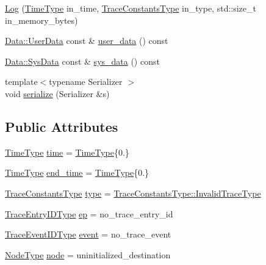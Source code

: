 \begin{DoxyCompactItemize}
\item 
\hyperlink{structvt_1_1trace_1_1_log_aeb68eef0ad06908635851378e2590b66}{Log} (\hyperlink{namespacevt_a2b9f28078dc309ad0706b69ded743e69}{Time\+Type} in\+\_\+time, \hyperlink{namespacevt_1_1trace_acf454dfbd581b0ebae895f90b5927a1d}{Trace\+Constants\+Type} in\+\_\+type, std\+::size\+\_\+t in\+\_\+memory\+\_\+bytes)
\item 
\hyperlink{structvt_1_1trace_1_1_log_1_1_data_1_1_user_data}{Data\+::\+User\+Data} const  \& \hyperlink{structvt_1_1trace_1_1_log_a7b251bc7dcebcbbafa29cc2ca6ea4c12}{user\+\_\+data} () const
\item 
\hyperlink{structvt_1_1trace_1_1_log_1_1_data_1_1_sys_data}{Data\+::\+Sys\+Data} const  \& \hyperlink{structvt_1_1trace_1_1_log_a082937c397ac5b47ffc9089ff94698f0}{sys\+\_\+data} () const
\item 
{\footnotesize template$<$typename Serializer $>$ }\\void \hyperlink{structvt_1_1trace_1_1_log_ac2fb17b80708e2adf690e3b68d225c25}{serialize} (Serializer \&s)
\end{DoxyCompactItemize}
\subsection*{Public Attributes}
\begin{DoxyCompactItemize}
\item 
\hyperlink{namespacevt_a2b9f28078dc309ad0706b69ded743e69}{Time\+Type} \hyperlink{structvt_1_1trace_1_1_log_ad707df71373f1f27df811868ea39bd3a}{time} = \hyperlink{namespacevt_a2b9f28078dc309ad0706b69ded743e69}{Time\+Type}\{0.\}
\item 
\hyperlink{namespacevt_a2b9f28078dc309ad0706b69ded743e69}{Time\+Type} \hyperlink{structvt_1_1trace_1_1_log_a577104fb3bef671a4c0129beaecaec2d}{end\+\_\+time} = \hyperlink{namespacevt_a2b9f28078dc309ad0706b69ded743e69}{Time\+Type}\{0.\}
\item 
\hyperlink{namespacevt_1_1trace_acf454dfbd581b0ebae895f90b5927a1d}{Trace\+Constants\+Type} \hyperlink{structvt_1_1trace_1_1_log_a6415eacd3721d71029ff6edb909fc63d}{type} = \hyperlink{namespacevt_1_1trace_acf454dfbd581b0ebae895f90b5927a1da319f6b5fbfb85275879d449149167c7e}{Trace\+Constants\+Type\+::\+Invalid\+Trace\+Type}
\item 
\hyperlink{namespacevt_1_1trace_a3c14050715ba9eceaeff51fb3de64f2f}{Trace\+Entry\+I\+D\+Type} \hyperlink{structvt_1_1trace_1_1_log_aaeb605b768747d37e7b4bb062f14bb32}{ep} = no\+\_\+trace\+\_\+entry\+\_\+id
\item 
\hyperlink{namespacevt_1_1trace_a64a7185f3e102df8d8258f263ccd1582}{Trace\+Event\+I\+D\+Type} \hyperlink{structvt_1_1trace_1_1_log_a88aa88893277f0feb9776e96048a9294}{event} = no\+\_\+trace\+\_\+event
\item 
\hyperlink{namespacevt_a866da9d0efc19c0a1ce79e9e492f47e2}{Node\+Type} \hyperlink{structvt_1_1trace_1_1_log_a39a932cb9c4775f83117d0be477bc8c8}{node} = uninitialized\+\_\+destination
\end{DoxyCompactItemize}
